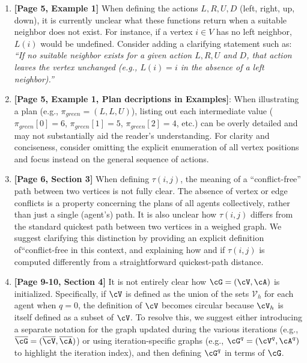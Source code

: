 \documentclass{article}
\newcommand{\beginquote}{``}
\begin{document}
\begin{enumerate}

   

\item \textbf{[Page 5, Example 1]} When defining the actions \(L, R, U, D\) (left, right, up, down), it is currently unclear what these functions return when a suitable neighbor does not exist. 
    For instance, if a vertex \(i \in V\) has no left neighbor, \(L(i)\) would be undefined. 
    Consider adding a clarifying statement such as:
    \emph{\beginquote If no suitable neighbor exists for a given action \(L,R,U\) and \(D\), that action leaves the vertex unchanged (e.g., \(L(i) = i\) in the absence of a left neighbor).''}


\item \textbf{[Page 5, Example 1, Plan decriptions in Examples]}:  When illustrating a plan (e.g., \(\pi_{green} = (L, L, U)\)), listing out each intermediate value 
    (\(\pi_{green}[0] = 6\), \(\pi_{green}[1] = 5\), \(\pi_{green}[2] = 4\), etc.) 
    can be overly detailed and may not substantially aid the reader's understanding. 
    For clarity and conciseness, consider omitting the explicit enumeration of all vertex positions 
    and focus instead on the general sequence of actions.

\item \textbf{[Page 6, Section 3]} 
    When defining \(\tau(i,j)\), the meaning of a \beginquote conflict-free'' path between two vertices is not fully clear. 
    The absence of vertex or edge conflicts is a property concerning the plans of all agents collectively, 
    rather than just a single (agent’s) path. It is also unclear how \(\tau(i,j)\) differs from the standard quickest path between two vertices in a weighed graph. 
    We suggest clarifying this distinction by providing an explicit definition of\beginquote conflict-free in this context, 
    and explaining how and if \(\tau(i,j)\) is computed differently from a straightforward quickest-path distance.


\item \textbf{[Page 9-10, Section 4]} 
    It is not entirely clear how \(\cG = (\cV, \cA)\) is initialized. 
    Specifically, if \(\cV\) is defined as the union of the sets \(\mathcal{V}_h\) for each agent when \(q=0\), 
    the definition of \(\cV\) becomes circular because \(\cV_h\) is itself defined as a subset of \(\cV\). 
    To resolve this, we suggest either introducing a separate notation 
    for the graph updated during the various iterations
    (e.g., \(\overline{\cG} = (\overline{\cV}, \overline{\cA})\)) 
    or using iteration-specific graphs 
    (e.g., \(\cG^q = (\cV^q, \cA^q)\) to highlight the iteration index), 
    and then defining \(\cG^q\) in terms of \({\cG}\). 


\end{enumerate}
\end{document}

